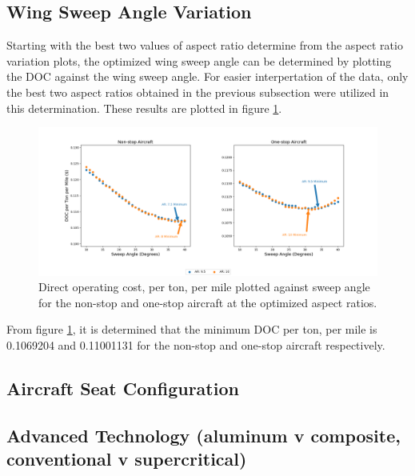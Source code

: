 \documentclass{article}
\begin{document}
    \subsection{Wing Sweep Angle Variation}
        \begin{flushleft}
            Starting with the best two values of aspect ratio determine from the
            aspect ratio variation plots, the optimized wing sweep angle can be
            determined by plotting the DOC against the wing sweep angle. For
            easier interpertation of the data, only the best two aspect ratios
            obtained in the previous subsection were utilized in this
            determination. These results are plotted in figure \ref{fig:AR}.

            \begin{figure}[ht]
                \centering
                \includegraphics[scale=0.4]{AR Plot.PNG}
                \caption{Direct operating cost, per ton, per mile plotted against sweep angle for the non-stop and one-stop aircraft at the optimized aspect ratios.}
                \label{fig:AR}
            \end{figure}

            From figure \ref{fig:AR}, it is determined that the minimum DOC per ton, per mile is 0.1069204 and 0.11001131 for the non-stop and one-stop aircraft respectively.

        \end{flushleft}
    \subsection{Aircraft Seat Configuration}
    \subsection{Advanced Technology (aluminum v composite, conventional v supercritical)}
\end{document}
